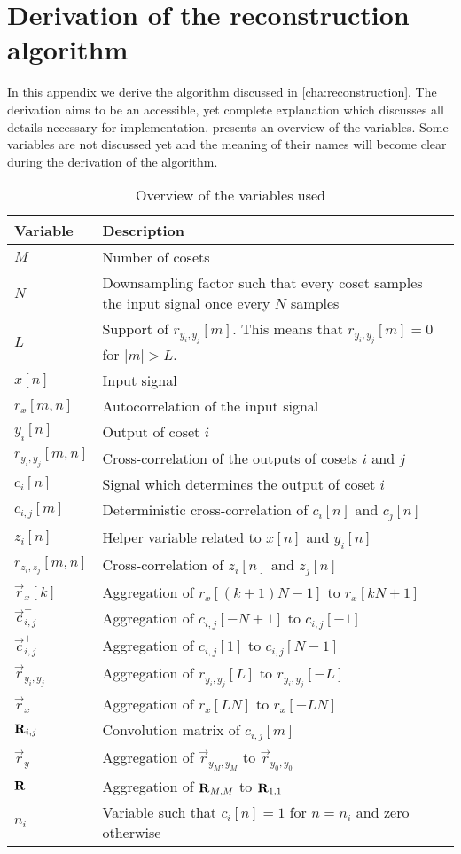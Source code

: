 \documentclass[a4paper, openany, oneside]{memoir}
\begin{document}
\chapter{Derivation of the reconstruction algorithm}
\label{sec:reconstruction-derivation}
In this appendix we derive the algorithm discussed in \cref{cha:reconstruction}. The derivation aims to be an accessible, yet complete explanation which discusses all details necessary for implementation.  presents an overview of the variables. Some variables are not discussed yet and the meaning of their names will become clear during the derivation of the algorithm.

\begin{table}[H]
    \centering
    \begin{tabularx}{\textwidth}{lY}
        \textbf{Variable} & \textbf{Description}\\ \hline
        $M$ & Number of cosets \\
        $N$ & Downsampling factor such that every coset samples the input signal once every $N$ samples \\
        $L$ & Support of $r_{y_i,y_j}[m]$. This means that $r_{y_i,y_j}[m]=0$ for $|m| > L$. \\
        $x[n]$ & Input signal \\
        $r_x[m,n]$ & Autocorrelation of the input signal \\
        $y_i[n]$ & Output of coset $i$ \\
        $r_{y_i,y_j}[m,n]$ & Cross-correlation of the outputs of cosets $i$ and $j$ \\
        $c_i[n]$ & Signal which determines the output of coset $i$ \\
        $c_{i,j}[m]$ & Deterministic cross-correlation of $c_i[n]$ and $c_j[n]$ \\
        $z_i[n]$ & Helper variable related to $x[n]$ and $y_i[n]$ \\
        $r_{z_i,z_j}[m,n]$ & Cross-correlation of $z_i[n]$ and $z_j[n]$ \\
        $\vec{r}_x[k]$ & Aggregation of $r_x[(k+1)N-1]$ to $r_x[kN+1]$ \\
        $\vec{c}_{i,j}^-$ & Aggregation of $c_{i,j}[-N+1]$ to $c_{i,j}[-1]$ \\
        $\vec{c}_{i,j}^+$ & Aggregation of $c_{i,j}[1]$ to $c_{i,j}[N-1]$ \\
        $\vec{r}_{y_i,y_j}$ & Aggregation of $r_{y_i,y_j}[L]$ to $r_{y_i,y_j}[-L]$ \\
        $\vec{r}_x$ & Aggregation of $r_x[LN]$ to $r_x[-LN]$ \\
        $\boldsymbol{\mathbf{R}}_{i,j}$ & Convolution matrix of $c_{i,j}[m]$ \\
        $\vec{r}_y$ & Aggregation of $\vec{r}_{y_M,y_M}$ to $\vec{r}_{y_0,y_0}$ \\
        $\boldsymbol{\mathbf{R}}$ & Aggregation of $\boldsymbol{\mathbf{R}}_{M,M}$ to $\boldsymbol{\mathbf{R}}_{1,1}$ \\
        $n_i$ & Variable such that $c_i[n]=1$ for $n=n_i$ and zero otherwise
    \end{tabularx}
    \caption{Overview of the variables used}
    \label{tab:reconstruction-overview-variables}
\end{table}
\end{document}
